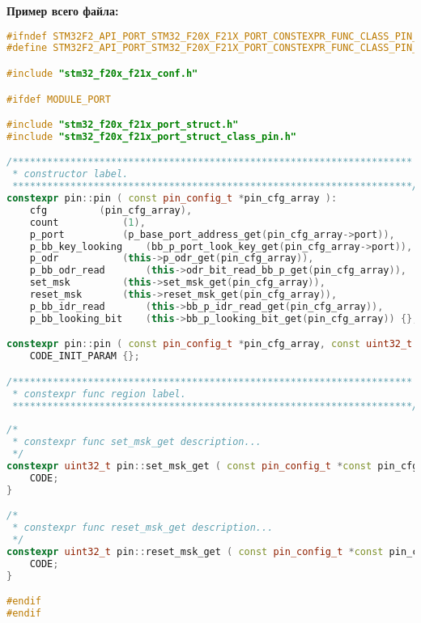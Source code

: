 \textbf{Пример всего файла:}\begin{lstlisting}[language=C++, frame=tlBR, basicstyle=\fontsize{9}{9}\ttfamily]
#ifndef STM32F2_API_PORT_STM32_F20X_F21X_PORT_CONSTEXPR_FUNC_CLASS_PIN_H_
#define STM32F2_API_PORT_STM32_F20X_F21X_PORT_CONSTEXPR_FUNC_CLASS_PIN_H_

#include "stm32_f20x_f21x_conf.h"

#ifdef MODULE_PORT

#include "stm32_f20x_f21x_port_struct.h"
#include "stm32_f20x_f21x_port_struct_class_pin.h"

/*********************************************************************
 * constructor label.
 *********************************************************************/
constexpr pin::pin ( const pin_config_t *pin_cfg_array ):
	cfg			(pin_cfg_array),
	count			(1),
	p_port			(p_base_port_address_get(pin_cfg_array->port)),
	p_bb_key_looking	(bb_p_port_look_key_get(pin_cfg_array->port)),
	p_odr			(this->p_odr_get(pin_cfg_array)),
	p_bb_odr_read		(this->odr_bit_read_bb_p_get(pin_cfg_array)),
	set_msk			(this->set_msk_get(pin_cfg_array)),
	reset_msk		(this->reset_msk_get(pin_cfg_array)),
	p_bb_idr_read		(this->bb_p_idr_read_get(pin_cfg_array)),
	p_bb_looking_bit	(this->bb_p_looking_bit_get(pin_cfg_array)) {};

constexpr pin::pin ( const pin_config_t *pin_cfg_array, const uint32_t pin_cout ):
	CODE_INIT_PARAM {};

/*********************************************************************
 * constexpr func region label.
 *********************************************************************/
 
/*
 * constexpr func set_msk_get description...
 */
constexpr uint32_t pin::set_msk_get ( const pin_config_t *const pin_cfg_array ) {
	CODE;
}

/*
 * constexpr func reset_msk_get description...
 */
constexpr uint32_t pin::reset_msk_get ( const pin_config_t *const pin_cfg_array ) {
	CODE;
}

#endif
#endif\end{lstlisting}

